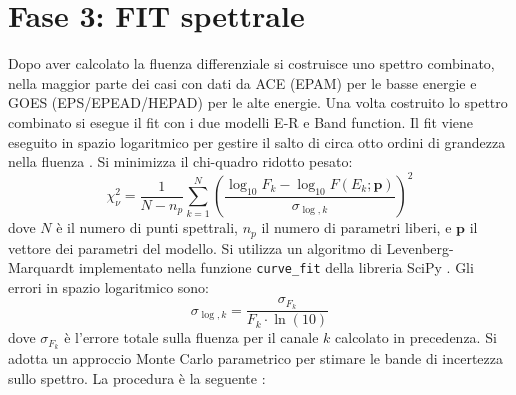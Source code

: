 \documentclass[12pt]{report}
\begin{document}
\section{Fase 3: FIT spettrale}
Dopo aver calcolato la fluenza differenziale si costruisce uno spettro combinato, nella maggior parte dei casi con dati da ACE (EPAM) per le basse energie e GOES (EPS/EPEAD/HEPAD) per le alte energie. Una volta costruito lo spettro combinato si esegue il fit con i due modelli E-R e Band function. Il fit viene eseguito in spazio logaritmico per gestire il salto di circa otto ordini di grandezza nella fluenza \cite{Wang2024}. Si minimizza il chi-quadro ridotto pesato:
\begin{equation}
\chi^2_\nu = \frac{1}{N - n_p}\sum_{k=1}^{N} \left(\frac{\log_{10}F_k - \log_{10}F(E_k; \mathbf{p})}{\sigma_{\log,k}}\right)^2
\label{eq:chi2}
\end{equation}
dove $N$ è il numero di punti spettrali, $n_p$ il numero di parametri liberi, e $\mathbf{p}$ il vettore dei parametri del modello. 
\clearpage 
\noindent Si utilizza un algoritmo di Levenberg-Marquardt \cite{Marquardt1963} implementato nella funzione \texttt{curve\_fit} della libreria SciPy \cite{SciPy_curvefit}.
Gli errori in spazio logaritmico sono:
\begin{equation}
    \sigma_{\log,k} = \frac{\sigma_{F_k}}{F_k \cdot \ln(10)} 
\end{equation}
dove $\sigma_{F_k}$ è l'errore totale sulla fluenza per il canale $k$ calcolato in precedenza. 
Si adotta un approccio Monte Carlo parametrico per stimare le bande di incertezza sullo spettro. La procedura è la seguente \cite{NumericalRecipes2007}:
\end{document}
